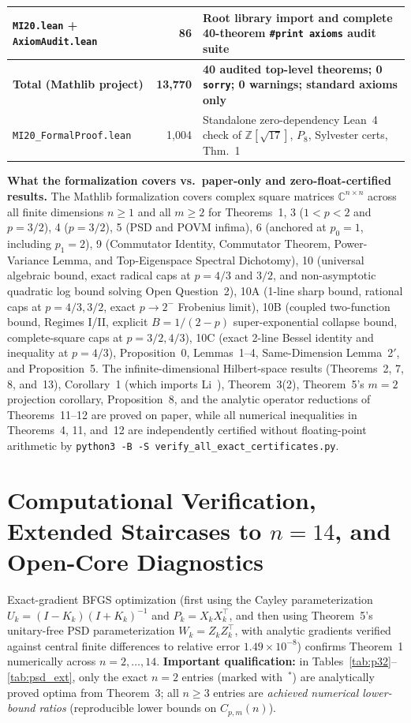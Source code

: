 \documentclass[10pt,letterpaper]{article}
\newcommand{\C}{\mathbb{C}}
\begin{document}
\begin{table}[htbp]
\begin{tabular}{@{}l r >{\raggedright\arraybackslash}p{8.4cm}@{}}
\texttt{MI20.lean} + \texttt{AxiomAudit.lean} & 86 & Root library import and complete 40-theorem \texttt{\#print axioms} audit suite \\
\midrule
\textbf{Total (Mathlib project)}         & \textbf{13,770} & \textbf{40 audited top-level theorems; 0 \texttt{sorry}; 0 warnings; standard axioms only} \\
\texttt{MI20\_FormalProof.lean}          &  1,004 & Standalone zero-dependency Lean~4 check of $\mathbb{Z}[\sqrt{17}]$, $P_8$, Sylvester certs, Thm.~1 \\
\bottomrule
\end{tabular}
\label{tab:lean}
\end{table}

\textbf{What the formalization covers vs.\ paper-only and zero-float-certified results.}
The Mathlib formalization covers complex square matrices $\C^{n\times n}$ across all finite dimensions $n \ge 1$ and all $m \ge 2$ for Theorems~1, 3 ($1<p<2$ and $p=3/2$), 4 ($p=3/2$), 5 (PSD and POVM infima), 6 (anchored at $p_0 = 1$, including $p_1 = 2$), 9 (Commutator Identity, Commutator Theorem, Power-Variance Lemma, and Top-Eigenspace Spectral Dichotomy), 10 (universal algebraic bound, exact radical caps at $p = 4/3$ and $3/2$, and non-asymptotic quadratic log bound solving Open Question~2), 10A (1-line sharp bound, rational caps at $p=4/3, 3/2$, exact $p \to 2^-$ Frobenius limit), 10B (coupled two-function bound, Regimes I/II, explicit $B = 1/(2-p)$ super-exponential collapse bound, complete-square caps at $p=3/2, 4/3$), 10C (exact 2-line Bessel identity and inequality at $p = 4/3$), Proposition~0, Lemmas~1--4, Same-Dimension Lemma~2$'$, and Proposition~5. The infinite-dimensional Hilbert-space results (Theorems~2, 7, 8, and~13), Corollary~1 (which imports Li~\cite{Li2026}), Theorem~3(2), Theorem~5's $m=2$ projection corollary, Proposition~8, and the analytic operator reductions of Theorems~11--12 are proved on paper, while all numerical inequalities in Theorems~4, 11, and~12 are independently certified without floating-point arithmetic by \texttt{python3 -B -S verify\_all\_exact\_certificates.py}.

\section{Computational Verification, Extended Staircases to $n = 14$, and Open-Core Diagnostics}

Exact-gradient BFGS optimization (first using the Cayley parameterization $U_k = (I - K_k)(I + K_k)^{-1}$ and $P_k = X_k X_k^\top$, and then using Theorem~5's unitary-free PSD parameterization $W_k = Z_k Z_k^\top$, with analytic gradients verified against central finite differences to relative error $1.49\times 10^{-8}$) confirms Theorem~1 numerically across $n = 2,\dots,14$. \textbf{Important qualification:} in Tables~\ref{tab:p32}--\ref{tab:psd_ext}, only the exact $n = 2$ entries (marked with~$^*$) are analytically proved optima from Theorem~3; all $n \ge 3$ entries are \emph{achieved numerical lower-bound ratios} (reproducible lower bounds on $C_{p,m}(n)$).
\end{document}
